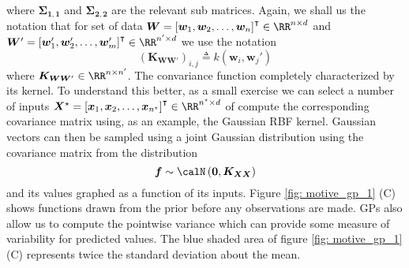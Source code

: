 where $\bm{\Sigma_{1,1}}$ and $\bm{\Sigma_{2,2}}$ are the relevant sub matrices. Again, we shall us the notation that for set of data $\bm{W} = \left[ \bm{w}_1 ,\bm{w}_2 , \ldots , \bm{w}_n \right]^{\intercal} \in \RR^{n \times d}$ and $\bm{W}' = \left[ \bm{w}_1' ,\bm{w}_2' , \ldots , \bm{w}_m' \right]^{\intercal} \in \RR^{n' \times d}$ we use the notation
\[
    \left( \bm{K}_{\bm{W} \bm{W}'} \right)_{i,j} \triangleq k \left( \bm{w}_i , \bm{w}_j' \right)
\]
where \( \bm{K}_{\bm{W} \bm{W}'} \in \RR^{n \times n'} \). The convariance function completely characterized by its kernel. To understand this better, as a small exercise we can select a number of inputs $\bm{X}^{\star} = \left[ \bm{x}_1 , \bm{x}_2 , \ldots , \bm{x}_{n^{\star}} \right]^{\intercal} \in \RR^{n^{\star} \times d}$ of compute the corresponding covariance matrix using, as an example, the Gaussian RBF kernel. Gaussian vectors can then be sampled using a joint Gaussian distribution using the covariance matrix from the distribution
\[
    \bm{f} \sim \calN \left( \bm{0}, \bm{K_{XX}} \right)
\]
and its values graphed as a function of its inputs. Figure \ref{fig: motive_gp_1} (C) shows functions drawn from the prior before any observations are made. GPs also allow us to compute the pointwise variance which can provide some measure of variability for predicted values. The blue shaded area of figure \ref{fig: motive_gp_1} (C) represents twice the standard deviation about the mean.

